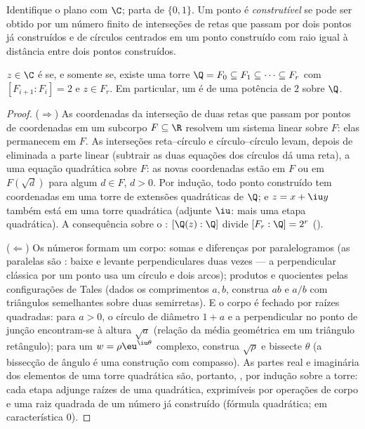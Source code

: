 \begin{definition}\label{def:b3:galois:constructible}
Identifique o plano com $\C$; parta de $\{0, 1\}$. Um ponto é
\emph{construtível} se pode ser obtido por
um número finito de interseções de retas que passam por dois pontos já
construídos e de círculos centrados em um ponto construído com raio
igual à distância entre dois pontos construídos.
\end{definition}

\begin{theorem}[Wantzel]\label{thm:b3:galois:wantzel}
$z \in \C$ é  se, e somente se, existe uma torre $\Q = F_0
\subseteq F_1 \subseteq \dots \subseteq F_r$ com $[F_{i+1} :
F_i] = 2$
e $z \in F_r$. Em particular, um  é  de  uma
potência de $2$ sobre $\Q$.
\end{theorem}

\begin{proof}
($\Rightarrow$) As coordenadas da interseção de duas retas que passam por
pontos de coordenadas em um subcorpo $F \subseteq \R$ resolvem um sistema linear
sobre $F$: elas permanecem em $F$. As interseções reta--círculo
e círculo--círculo levam, depois de eliminada a parte linear
(subtrair as duas equações dos círculos dá uma reta), a uma equação
quadrática sobre $F$: as novas coordenadas estão em $F$ ou em
$F(\sqrt d)$ para algum $d \in F$, $d > 0$. Por indução, todo ponto construído
tem coordenadas em uma torre de extensões quadráticas de $\Q$; e
$z = x + \iu y$ também está em uma torre quadrática (adjunte $\iu$: mais uma
etapa quadrática). A consequência sobre o : $[\Q(z):\Q]$ divide $[F_r : \Q] = 2^r$
().

($\Leftarrow$) Os números  formam um corpo: somas e diferenças
por paralelogramos (as paralelas são : baixe e levante
perpendiculares duas vezes --- a perpendicular clássica por um ponto
usa um círculo e dois arcos); produtos e quocientes pelas configurações
de Tales (dados os comprimentos $a, b$, construa $ab$ e
$a/b$ com triângulos semelhantes sobre duas semirretas). E o corpo
é fechado por raízes quadradas: para $a > 0$, o círculo de diâmetro
$1 + a$ e a perpendicular no ponto de junção encontram-se à altura
$\sqrt a$ (relação da média geométrica em um triângulo retângulo); para um
$w = \rho\eu^{\iu\theta}$ complexo, construa $\sqrt\rho$ e bissecte $\theta$ (a bissecção de
ângulo é uma construção com compasso). As partes real e imaginária dos
elementos de uma torre quadrática são, portanto, , por
indução sobre a torre: cada etapa adjunge raízes de uma quadrática,
exprimíveis por operações de corpo e uma raiz quadrada de um número já
construído (fórmula quadrática; em característica $0$).
\end{proof}

